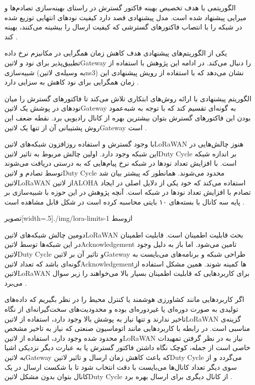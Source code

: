 الگوریتمی با هدف تخصیص بهینه فاکتور گسترش در راستای بهینه‌سازی تصادم‌ها و میرایی پیشنهاد شده است.
مدل پیشنهادی قصد دارد کیفیت نودهای انتهایی توزیع شده در شبکه را با انتصاب فاکتورهای گسترشی که کیفیت ارسال را بیشینه می‌کنند، بهینه کند
.

یکی از الگوریتم‌های پیشنهادی هدف کاهش زمان همگرایی در مکانیزم نرخ داده تطبیق‌پذیر برای نود و ‌لاتین{Gateway} را دنبال می‌کند.
در ادامه این پژوهش با استفاده از شبیه‌سازی (به وسیله‌ی ‌لاتین{ns3}) نشان می‌دهد که با استفاده از رویش پیشنهادی این زمان همگرایی برای نود کاهش به سزایی دارد
.

الگوریتم پیشنهادی با ارائه روش‌های ابتکاری تلاش می‌کند تا فاکتورهای گسترش را میان نودهای در پوشش یک ‌لاتین{Gateway} به گونه‌ای تقسیم کند
که با توجه به شبه‌عمود بودن این فاکتورهای گسترش بتوان بیشترین بهره از کانال رادیویی برد. نقطه ضعف این روش پشتیبانی آن از تنها یک ‌لاتین{Gateway}
است
.


با وجود گسترش و استفاده روزافزون شبکه‌های ‌لاتین{LoRaWAN} هنوز چالش‌هایی در این شبکه وجود دارد. اولین چالش مربوط به تاثیر
‌لاتین{Duty Cycle} بر اندازه شبکه است. با افزایش تعداد نودها در شبکه نرخ پیام‌هایی که به درستی دریافت می‌شوند توسط تصادم و
‌لاتین{Duty Cycle} محدود می‌شوند. همانطور که پیشتر بیان شد ‌لاتین{LoRaWAN} از ‌لاتین{ALOHA} استفاده می‌کند
که خود یکی از دلایل اصلی در ایجاد تصادم با افزایش تعداد نودها در شبکه است. آنچه پژوهش  در این حوزه
با شبیه‌سازی بر پایه سه کانال با بسته‌های ۱۰ بایتی محاسبه کرده است در شکل  قابل مشاهده است
.

‌تصویر[width=.5\textwidth]{./img/lora-limits-1}
‌ازوسط

دومین چالش شبکه‌های ‌لاتین{LoRaWAN} بحث قابلیت اطمینان است. قابلیت اطمینان در این شبکه‌ها توسط ‌لاتین{Acknowledgement} تامین می‌شود.
اما باز به دلیل وجود ‌لاتین{Duty Cycle} و تاثیر آن بر ‌لاتین{Gateway} طراحی شبکه و برنامه‌های می‌بایست به گونه‌ای باشد که تعداد ‌لاتین{Acknowledgement}ها کمینه شوند.
همین مشکل استفاده از ‌لاتین{LoRaWAN} برای کاربردهایی که قابلیت اطمینان بسیار بالا می‌خواهند را زیر سوال می‌برد
.

اگر کاربردهایی مانند کشاورزی هوشمند یا کنترل محیط را در نظر بگیریم که داده‌های تولیدی به صورت دوره‌ای یا غیردوره‌ای بوده و محدودیت‌های سخت‌گیرانه‌ای از نگاه تاخیر ندارند و تنها نیاز به پوشش بالا وجود دارد،
استفاده از ‌لاتین{LoRaWAN} گزینه‌ی مناسبی است. در رابطه با کاربردهایی مانند اتوماسیون صنعتی که نیاز به تاخیر مشخص و محدود شده وجود دارد، استفاده از ‌لاتین{LoRaWAN} نیاز به در نظر گرفتن تمهیدات
خاصی است از جمله، کوچک نگاه داشتن فاکتور گسترش یا به عبارت دیگر نزدیکی اشیا به ‌لاتین{Gateway} که باعث کاهش زمان ارسال و تاثیر ‌لاتین{Duty Cycle} می‌گردد و از سوی دیگر تعداد کانال‌ها می‌بایست
با دقت انتخاب شود تا با شکست ارسال در یک کانال بتوان بدون مشکل ‌لاتین{Duty Cycle} از کانال دیگری برای ارسال بهره برد
.

